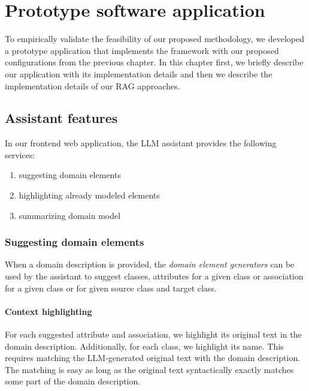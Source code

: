 \chapter{Prototype software application}
\label{chap:protype_software_application}

To empirically validate the feasibility of our proposed methodology, we developed a prototype application that implements the framework with our proposed configurations from the previous chapter. In this chapter first, we briefly describe our application with its implementation details and then we describe the implementation details of our RAG approaches.


\section{Assistant features}

In our frontend web application, the LLM assistant provides the following services:

\begin{enumerate}
\item suggesting domain elements
\item highlighting already modeled elements
\item summarizing domain model
\end{enumerate}


\subsection{Suggesting domain elements}

When a domain description is provided, the \emph{domain element generators} can be used by the assistant to suggest classes, attributes for a given class or association for a given class or for given source class and target class. 


\subsubsection{Context highlighting}
\label{sec:context_highlighting}

For each suggested attribute and association, we highlight its original text in the domain description. Additionally, for each class, we highlight its name. This requires matching the LLM-generated original text with the domain description. The matching is easy as long as the original text syntactically exactly matches some part of the domain description.

